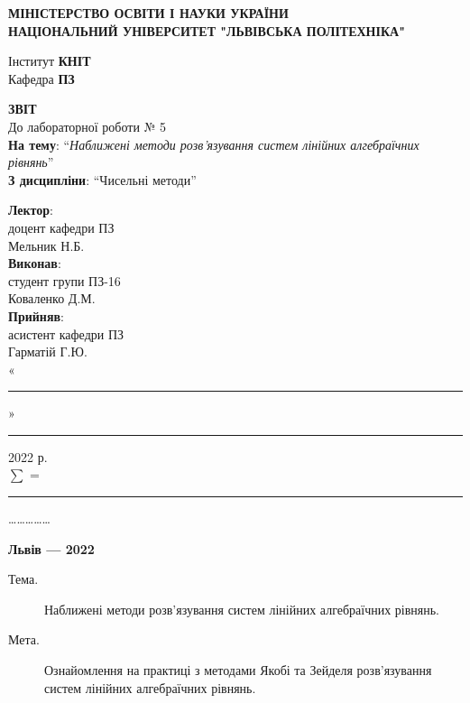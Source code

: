 \documentclass{article}
\newcommand\subject{Чисельні методи}
\newcommand\lecturer{доцент кафедри ПЗ\\Мельник Н.Б.}
\newcommand\teacher{асистент кафедри ПЗ\\Гарматій Г.Ю.}
\newcommand\mygroup{ПЗ-16}
\newcommand\lab{5}
\newcommand\theme{Наближені методи розв’язування систем лінійних алгебраїчних рівнянь}
\newcommand\purpose{Ознайомлення на практиці з методами Якобі та Зейделя
	розв’язування систем лінійних алгебраїчних рівнянь}
\begin{document}
	\begin{large}
		\begin{titlepage}
			\thispagestyle{empty}
			\begin{center}
				\textbf{МІНІСТЕРСТВО ОСВІТИ І НАУКИ УКРАЇНИ\\
					НАЦІОНАЛЬНИЙ УНІВЕРСИТЕТ "ЛЬВІВСЬКА ПОЛІТЕХНІКА"}
			\end{center}
			\begin{flushright}
				Інститут \textbf{КНІТ}\\
				Кафедра \textbf{ПЗ}
			\end{flushright}
			\vspace{200pt}
			\begin{center}
				\textbf{ЗВІТ}\\
				\vspace{10pt}
				До лабораторної роботи № \lab\\
				\textbf{На тему}: “\textit{\theme}”\\
				\textbf{З дисципліни}: “\subject”
			\end{center}
			\vspace{90pt}
			\begin{flushright}
				
				\textbf{Лектор}:\\
				\lecturer\\
				\vspace{28pt}
				\textbf{Виконав}:\\
				
				студент групи \mygroup\\
				Коваленко Д.М.\\
				\vspace{28pt}
				\textbf{Прийняв}:\\
				
				\teacher\\
				
				\vspace{28pt}
				«\rule{1cm}{0.15mm}» \rule{1.5cm}{0.15mm} 2022 р.\\
				$\sum$ = \rule{1cm}{0.15mm}……………\\
				
			\end{flushright}
			\vspace{\fill}
			\begin{center}
				\textbf{Львів — 2022}
			\end{center}
		\end{titlepage}
		
		\begin{description}
			\item[Тема.] \theme.
			\item[Мета.] \purpose.
		\end{description}
		

\end{large}
\end{document}

